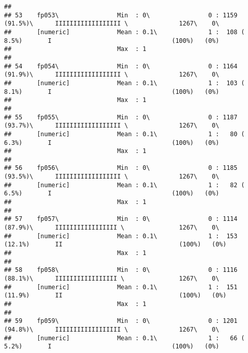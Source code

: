 \documentclass[]{article}
\begin{document}
\begin{verbatim}
## 
## 53    fp053\                Min  : 0\                0 : 1159 (91.5%)\      IIIIIIIIIIIIIIIIII \              1267\    0\       
##       [numeric]             Mean : 0.1\              1 :  108 ( 8.5%)       I                                 (100%)   (0%)     
##                             Max  : 1                                                                                            
## 
## 54    fp054\                Min  : 0\                0 : 1164 (91.9%)\      IIIIIIIIIIIIIIIIII \              1267\    0\       
##       [numeric]             Mean : 0.1\              1 :  103 ( 8.1%)       I                                 (100%)   (0%)     
##                             Max  : 1                                                                                            
## 
## 55    fp055\                Min  : 0\                0 : 1187 (93.7%)\      IIIIIIIIIIIIIIIIII \              1267\    0\       
##       [numeric]             Mean : 0.1\              1 :   80 ( 6.3%)       I                                 (100%)   (0%)     
##                             Max  : 1                                                                                            
## 
## 56    fp056\                Min  : 0\                0 : 1185 (93.5%)\      IIIIIIIIIIIIIIIIII \              1267\    0\       
##       [numeric]             Mean : 0.1\              1 :   82 ( 6.5%)       I                                 (100%)   (0%)     
##                             Max  : 1                                                                                            
## 
## 57    fp057\                Min  : 0\                0 : 1114 (87.9%)\      IIIIIIIIIIIIIIIII \               1267\    0\       
##       [numeric]             Mean : 0.1\              1 :  153 (12.1%)       II                                (100%)   (0%)     
##                             Max  : 1                                                                                            
## 
## 58    fp058\                Min  : 0\                0 : 1116 (88.1%)\      IIIIIIIIIIIIIIIII \               1267\    0\       
##       [numeric]             Mean : 0.1\              1 :  151 (11.9%)       II                                (100%)   (0%)     
##                             Max  : 1                                                                                            
## 
## 59    fp059\                Min  : 0\                0 : 1201 (94.8%)\      IIIIIIIIIIIIIIIIII \              1267\    0\       
##       [numeric]             Mean : 0.1\              1 :   66 ( 5.2%)       I                                 (100%)   (0%)     

\end{verbatim}
\end{document}
